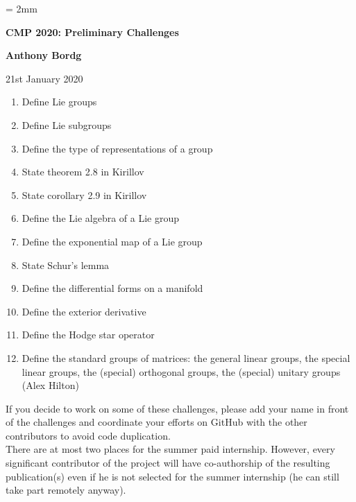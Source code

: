 \documentclass[12pt]{article}
\begin{document}
%
\parskip = 2mm
\begin{center}
{\bf\Large CMP 2020: Preliminary Challenges}

\vspace{3mm}

{\large\bf Anthony Bordg}
\vspace {3mm}

{21st January 2020}  
\end{center}

\begin{enumerate}
	\item Define Lie groups
	\item Define Lie subgroups
	\item Define the type of representations of a group
	\item State theorem 2.8 in Kirillov
	\item State corollary 2.9 in Kirillov
	\item Define the Lie algebra of a Lie group
	\item Define the exponential map of a Lie group
	\item State Schur's lemma
	\item Define the differential forms on a manifold
	\item Define the exterior derivative
	\item Define the Hodge star operator
	\item Define the standard groups of matrices: the general linear groups, the special linear groups, the (special) orthogonal groups, the (special) unitary groups (Alex Hilton)
\end{enumerate}

If you decide to work on some of these challenges, please add your name in front of the challenges and coordinate your efforts on GitHub with the other contributors to avoid code duplication. \\
There are at most two places for the summer paid internship. However, every significant contributor of the project will have co-authorship of the resulting publication(s) even if he is not selected for the summer internship (he can still take part remotely anyway).
\end{document}

